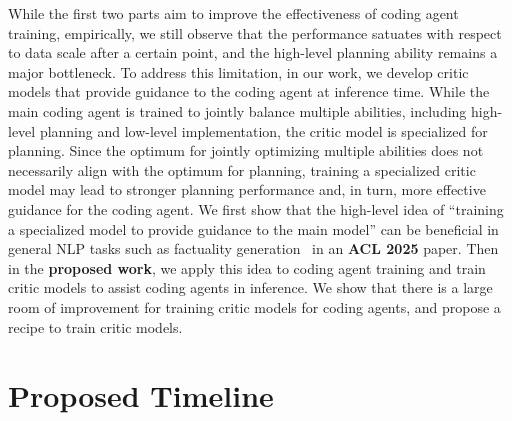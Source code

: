 \documentclass[12pt,openany]{cmuthesis}
\begin{document}
While the first two parts aim to improve the effectiveness of coding agent training, empirically, we still observe that the performance satuates with respect to data scale after a certain point, and the high-level planning ability remains a major bottleneck.
To address this limitation, in our work, we develop critic models that provide guidance to the coding agent at inference time.
While the main coding agent is trained to jointly balance multiple abilities, including high-level planning and low-level implementation, the critic model is specialized for planning.
Since the optimum for jointly optimizing multiple abilities does not necessarily align with the optimum for planning, training a specialized critic model may lead to stronger planning performance and, in turn, more effective guidance for the coding agent.
We first show that the high-level idea of ``training a specialized model to provide guidance to the main model'' can be beneficial in general NLP tasks such as factuality generation~\cite{fence} in an \textcolor{aquablue}{\textbf{ACL 2025}} paper.
Then in the \textbf{\textcolor{treegreen}{proposed work}}, we apply this idea to coding agent training and train critic models to assist coding agents in inference.
We show that there is a large room of improvement for training critic models for coding agents, and propose a recipe to train critic models.

\newpage
\section{Proposed Timeline}

\begin{figure}[h!]
    \centering
\end{figure}
\end{document}
